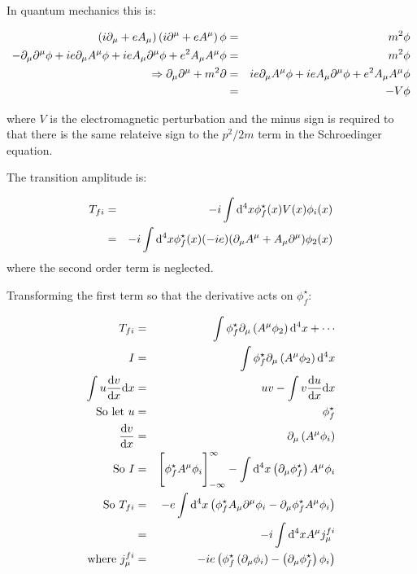In quantum mechanics this is:

\begin{eqnarray*}
  \left(i\partial_{\mu} + e A_{\mu}\right)\left(i\partial^{\mu} + e A^{\mu}\right)\phi & = & m^2 \phi \\
  -\partial_{\mu}\partial^{\mu}\phi + ie \partial_{\mu}A^{\mu}\phi + ie A_{\mu}\partial^{\mu}\phi + e^2A_{\mu}A^{\mu}\phi & = & m^2\phi \\
  \Rightarrow \partial_{\mu}\partial^{\mu} + m^2\partial & = & ie\partial_{\mu}A^{\mu}\phi + ie A_{\mu}\partial^{\mu}\phi + e^2A_{\mu}A^{\mu}\phi \\
  & = & -V\phi
\end{eqnarray*}

where $V$ is the electromagnetic perturbation and the minus sign is required to that there is the same relateive sign to the $p^2/2m$ term in the Schroedinger equation.

The transition amplitude is:

\begin{eqnarray*}
  T_{fi} & = & -i\int\mathrm{d}^4x\phi^{\star}_f(x)V(x)\phi_i(x) \\
         & = & -i\int\mathrm{d}^4x\phi^{\star}_f(x)(-ie)(\partial_{\mu}A^{\mu} + A_{\mu}\partial^{\mu})\phi_2(x)
\end{eqnarray*}
where the second order term is neglected.

Transforming the first term so that the derivative acts on $\phi^{\star}_f$:

\begin{eqnarray*}
  T_{fi} & = & \int \phi^{\star}_f \partial_{\mu}\left(A^{\mu}\phi_2\right)\mathrm{d}^4x + \cdots \\
  I & = & \int \phi^{\star}_f\partial_{\mu}\left(A^{\mu}\phi_2\right)\mathrm{d}^4x \\
  \int u\frac{\mathrm{d}v}{\mathrm{d}x}\mathrm{d}x & = & uv - \int v \frac{\mathrm{d}u}{\mathrm{d}x}\mathrm{d}x \\
  \textrm{So let } u & = & \phi^{\star}_f \\
  \frac{\mathrm{d}v}{\mathrm{d}x} & = & \partial_{\mu}\left(A^{\mu}\phi_i\right) \\
  \textrm{So } I & = & \Bigg[ \phi^{\star}_fA^{\mu}\phi_i\Bigg]_{-\infty}^{\infty} - \int\mathrm{d}^4x\left(\partial_{\mu}\phi^{\star}_f\right)A^{\mu}\phi_i \\
  \textrm{So }T_{fi} & = & -e\int\mathrm{d}^4x\left(\phi^{\star}_fA_{\mu}\partial^{\mu}\phi_i - \partial_{\mu}\phi^{\star}_fA^{\mu}\phi_i\right) \\
  & = & -i\int\mathrm{d}^4xA^{\mu}j^{fi}_{\mu} \\
  \textrm{where } j^{fi}_{\mu} & = & -ie\left(\phi^{\star}_f\left(\partial_{\mu}\phi_i\right) - \left(\partial_{\mu}\phi^{\star}_f\right)\phi_i\right)
\end{eqnarray*}

